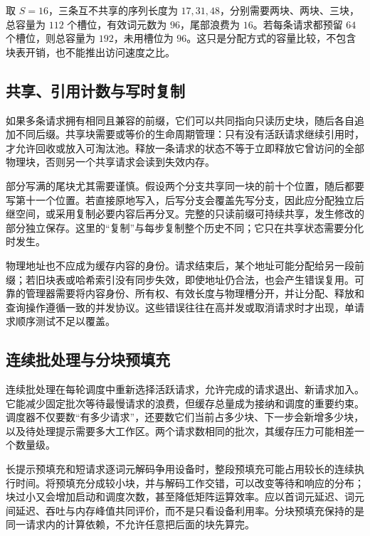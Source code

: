 \documentclass[UTF8,12pt,a4paper,fontset=fandol]{ctexart}
\begin{document}
\begin{example}[块大小与尾部浪费]
取 $S=16$，三条互不共享的序列长度为 $17,31,48$，分别需要两块、两块、三块，总容量为 $112$ 个槽位，有效词元数为 $96$，尾部浪费为 $16$。若每条请求都预留 $64$ 个槽位，则总容量为 $192$，未用槽位为 $96$。这只是分配方式的容量比较，不包含块表开销，也不能推出访问速度之比。
\end{example}

\subsection{共享、引用计数与写时复制}

如果多条请求拥有相同且兼容的前缀，它们可以共同指向只读历史块，随后各自追加不同后缀。共享块需要或等价的生命周期管理：只有没有活跃请求继续引用时，才允许回收或放入可淘汰池。释放一条请求的状态不等于立即释放它曾访问的全部物理块，否则另一个共享请求会读到失效内存。

部分写满的尾块尤其需要谨慎。假设两个分支共享同一块的前十个位置，随后都要写第十一个位置。若直接原地写入，后写分支会覆盖先写分支，因此应分配独立后继空间，或采用复制必要内容后再分叉。完整的只读前缀可持续共享，发生修改的部分独立保存。这里的“复制”与每步复制整个历史不同；它只在共享状态需要分化时发生。

物理地址也不应成为缓存内容的身份。请求结束后，某个地址可能分配给另一段前缀；若旧块表或哈希索引没有同步失效，即使地址仍合法，也会产生错误复用。可靠的管理器需要将内容身份、所有权、有效长度与物理槽分开，并让分配、释放和查询操作遵循一致的并发协议。这些错误往往在高并发或取消请求时才出现，单请求顺序测试不足以覆盖。

\subsection{连续批处理与分块预填充}

连续批处理在每轮调度中重新选择活跃请求，允许完成的请求退出、新请求加入。它能减少固定批次等待最慢请求的浪费，但缓存总量成为接纳和调度的重要约束。调度器不仅要数“有多少请求”，还要数它们当前占多少块、下一步会新增多少块，以及待处理提示需要多大工作区。两个请求数相同的批次，其缓存压力可能相差一个数量级。

长提示预填充和短请求逐词元解码争用设备时，整段预填充可能占用较长的连续执行时间。将预填充分成较小块，并与解码工作交错，可以改变等待和响应的分布；块过小又会增加启动和调度次数，甚至降低矩阵运算效率。应以首词元延迟、词元间延迟、吞吐与内存峰值共同评价，而不是只看设备利用率。分块预填充保持的是同一请求内的计算依赖，不允许任意把后面的块先算完。
\end{document}
